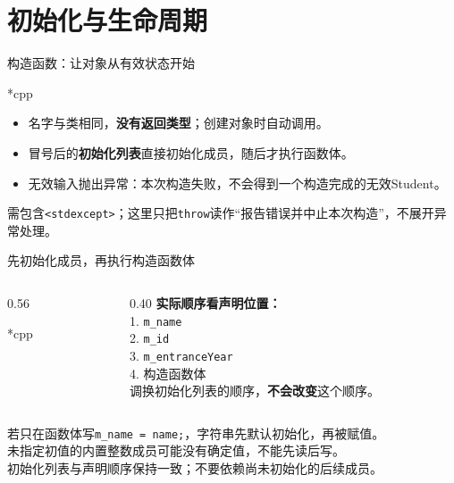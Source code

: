 \section{初始化与生命周期}

\begin{frame}{构造函数：让对象从有效状态开始}
    \begin{Code}*{cpp}
        
    \end{Code}
    \begin{itemize}
        \item 名字与类相同，\textbf{没有返回类型}；创建对象时自动调用。
        \item 冒号后的\textbf{初始化列表}直接初始化成员，随后才执行函数体。
        \item 无效输入抛出异常：本次构造失败，不会得到一个构造完成的无效Student。
    \end{itemize}
    \small 需包含\texttt{<stdexcept>}；这里只把\texttt{throw}读作“报告错误并中止本次构造”，不展开异常处理。
\end{frame}

\begin{frame}{先初始化成员，再执行构造函数体}
    \begin{columns}[T]
        \begin{column}{0.56\textwidth}
            \begin{Code}*{cpp}
                
            \end{Code}
        \end{column}
        \begin{column}{0.40\textwidth}
            \textbf{实际顺序看声明位置：}\\[6pt]
            1. \texttt{m\_name}\\
            2. \texttt{m\_id}\\
            3. \texttt{m\_entranceYear}\\
            4. 构造函数体\\[8pt]
            调换初始化列表的顺序，\textbf{不会改变}这个顺序。
        \end{column}
    \end{columns}
    \medskip
    若只在函数体写\texttt{m\_name = name;}，字符串先默认初始化，再被赋值。\\
    未指定初值的内置整数成员可能没有确定值，不能先读后写。\\
    \alert{初始化列表与声明顺序保持一致；不要依赖尚未初始化的后续成员。}
\end{frame}

